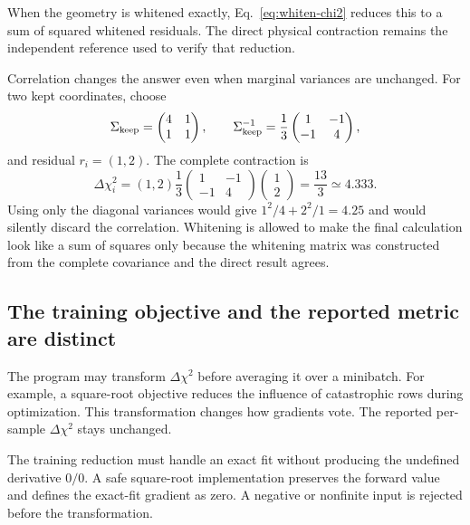 \documentclass[10pt,aps,prd,twocolumn,nofootinbib]{revtex4-2}
\begin{document}
When the geometry is whitened exactly, Eq.~\eqref{eq:whiten-chi2} reduces this
to a sum of squared whitened residuals.  The direct physical contraction
remains the independent reference used to verify that reduction.

Correlation changes the answer even when marginal variances are unchanged.
For two kept coordinates, choose
\begin{equation*}
 \Sigma_{\rm keep}=
 \begin{pmatrix}4&1\\1&1\end{pmatrix},\qquad
 \Sigma_{\rm keep}^{-1}=\frac13
 \begin{pmatrix}1&-1\\-1&4\end{pmatrix},
\end{equation*}
and residual $r_i=(1,2)$.  The complete contraction is
\begin{equation*}
 \Delta\chi_i^2=(1,2)\frac13
 \begin{pmatrix}1&-1\\-1&4\end{pmatrix}
 \begin{pmatrix}1\\2\end{pmatrix}=\frac{13}{3}\simeq4.333.
\end{equation*}
Using only the diagonal variances would give $1^2/4+2^2/1=4.25$ and would
silently discard the correlation.  Whitening is allowed to make the final
calculation look like a sum of squares only because the whitening matrix was
constructed from the complete covariance and the direct result agrees.

\subsection{The training objective and the reported metric are distinct}

The program may transform $\Delta\chi^2$ before averaging it over a minibatch.
For example, a square-root objective reduces the influence of catastrophic
rows during optimization.  This transformation changes how gradients vote.
The reported per-sample $\Delta\chi^2$ stays unchanged.

The training reduction must handle an exact fit without producing the
undefined derivative $0/0$.  A safe square-root implementation preserves the
forward value and defines the exact-fit gradient as zero.  A negative or
nonfinite input is rejected before the transformation.
\end{document}
